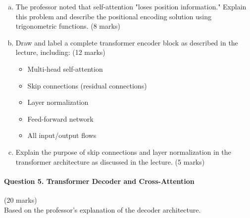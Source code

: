\documentclass[12pt]{article}
\newcommand{\shortanswer}{\vspace{2cm}}
\newcommand{\mediumanswer}{\vspace{3cm}}
\begin{document}
\begin{enumerate}[(a)]
    \item The professor noted that self-attention "loses position information." Explain this problem and describe the positional encoding solution using trigonometric functions. \hfill (8 marks)
    
    \mediumanswer
    
    \item Draw and label a complete transformer encoder block as described in the lecture, including: \hfill (12 marks)
    \begin{itemize}
        \item Multi-head self-attention
        \item Skip connections (residual connections)
        \item Layer normalization
        \item Feed-forward network
        \item All input/output flows
    \end{itemize}
    
    \begin{center}
    \end{center}
    
    \item Explain the purpose of skip connections and layer normalization in the transformer architecture as discussed in the lecture. \hfill (5 marks)
    
    \shortanswer
\end{enumerate}

\newpage
\paragraph{Question 5. Transformer Decoder and Cross-Attention}\hfill (20 marks)\\
Based on the professor's explanation of the decoder architecture.
\end{document}
